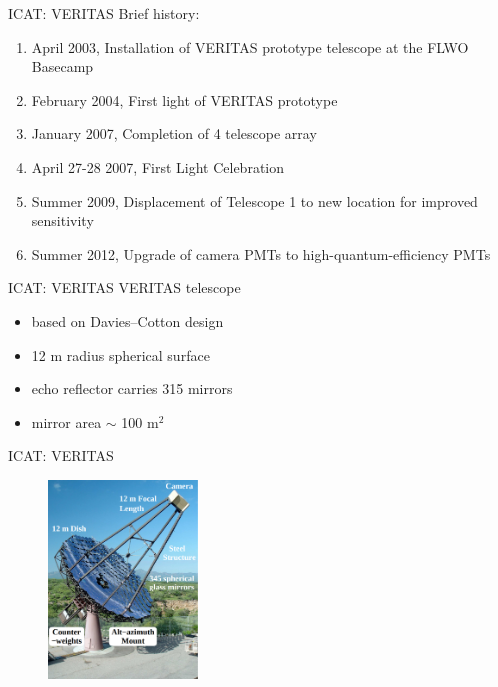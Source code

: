 \documentclass{beamer}
\begin{document}
\begin{frame}{ICAT: VERITAS}
    Brief history:
    \begin{enumerate}
        \item April 2003, Installation of VERITAS prototype telescope at the FLWO Basecamp
        \item February 2004, First light of VERITAS prototype
        \item January 2007, Completion of 4 telescope array
        \item April 27-28 2007, First Light Celebration
        \item Summer 2009, Displacement of Telescope 1 to new location for improved sensitivity
        \item Summer 2012, Upgrade of camera PMTs to high-quantum-efficiency PMTs
    \end{enumerate}
\end{frame}


\begin{frame}{ICAT: VERITAS}
    VERITAS telescope
    \begin{itemize}
        \item based on Davies–Cotton design
        \item 12 m radius spherical surface
        \item echo reflector carries 315 mirrors
        \item mirror area $\sim$ 100 $ \text{m}^2$
    \end{itemize}
\end{frame}


\begin{frame}{ICAT: VERITAS}
    \begin{figure}[h]
        \includegraphics[width=150px]{VERITAS_telescope.png}
    \end{figure}
\end{frame}
\end{document}
